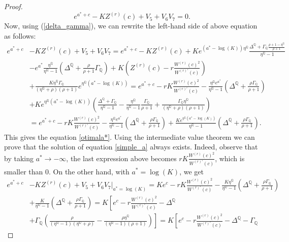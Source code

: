 \documentclass[10pt]{amsart}
\def\Q{{\mathbb{Q}}}
\begin{document}
\begin{proof}
			\begin{equation}\label{simple_a}
				e^{a^*+c} - KZ^{(r)}(c) + V_5 + V_6 V_7 = 0.
			\end{equation}
			Now, using (\ref{delta_gamma}), we can rewrite the left-hand side of above equation as follows:
			\begin{align*}
				e^{a^*+c}& - KZ^{(r)}(c) + V_5 + V_6 V_7 = e^{a^*+c} - KZ^{(r)}(c) + Ke^{(a^*-\log(K))\eta^\Q}\frac{\Delta^\Q + \Gamma_\Q \frac{\rho+1-\eta^\Q}{\rho+1}}{\eta^\Q-1} \\
				\nonumber & - e^{a^*} \frac{\eta^\Q}{\eta^\Q-1}\left( \Delta^\Q + \frac{\rho}{\rho+1}\Gamma_\Q \right) + K\left( Z^{(r)}(c) - r\frac{W^{(r)}(c)^2}{W^{(r)'}(c)} \right)  \\
				\nonumber &+ \frac{K\eta^\Q\Gamma_\Q}{\left(\eta^\Q + \rho\right)(\rho+1)}e^{\eta^\Q(a^*-\log(K))} = e^{a^*+c} - rK \frac{W^{(r)}(c)^2}{W^{(r)'}(c)} -  \frac{\eta^\Q e^{a^*}}{\eta^\Q-1}\left( \Delta^\Q + \frac{\rho\Gamma_\Q}{\rho+1} \right)
				\\
				\nonumber & + Ke^{\eta^\Q(a^*-\log(K))}\left( \frac{\Delta^\Q + \Gamma_\Q}{\eta^\Q - 1} - \frac{\eta^\Q}{\eta^\Q-1} \frac{\Gamma_\Q}{\rho + 1} + \frac{\Gamma_\Q\eta^\Q}{(\eta^\Q+\rho)(\rho+1)}\right)
				\\
				\nonumber & = e^{a^*+c} - rK \frac{W^{(r)}(c)^2}{W^{(r)'}(c)} -  \frac{\eta^\Q e^{a^*}}{\eta^\Q-1}\left( \Delta^\Q + \frac{\rho\Gamma_\Q}{\rho+1} \right)  + \frac{Ke^{\eta^\Q(a^*-\log(K))}}{\eta^\Q-1}\left( \Delta^\Q + \frac{\rho\Gamma_\Q}{\rho+1} \right).
			\end{align*}
			This gives the equation \eqref{otimala*}.
			Using the intermediate value theorem we can prove that the solution of equation \eqref{simple_a} always exists. Indeed, observe that by taking $a^* \rightarrow -\infty$, the last expression above
			becomes $rK \frac{W^{(r)}(c)^2}{W^{(r)'}(c)}$, which is smaller than $0$. On the other hand, with $a^* = \log(K)$, we get
			\begin{align*}
				e^{a^*+c}& - KZ^{(r)}(c) + V_5 + V_6 V_7\big|_{a^* = \log(K)} = Ke^c - rK\frac{W^{(r)}(c)^2}{W^{(r)'}(c)} - \frac{K\eta^\Q}{\eta^\Q-1}\left( \Delta^\Q + \frac{\rho\Gamma_\Q}{\rho+1} \right)
				\\
				\nonumber &+ \frac{K}{\eta^\Q-1}\left( \Delta^\Q + \frac{\rho\Gamma_\Q}{\rho+1} \right) = K\left[ e^c - r\frac{W^{(r)}(c)^2}{W^{(r)'}(c)} - \Delta^\Q  \right.
				\\
				\nonumber &+ \left. \Gamma_\Q\left( \frac{\rho}{(\eta^\Q-1)(\eta^\Q+\rho)}  - \frac{\rho \eta^\Q}{(\eta^\Q-1)(\rho+1)} \right) \right] = K\left[ e^c - r\frac{W^{(r)}(c)^2}{W^{(r)'}(c)} - \Delta^\Q - \Gamma_\Q \right.

\end{align*}
\end{proof}
\end{document}
